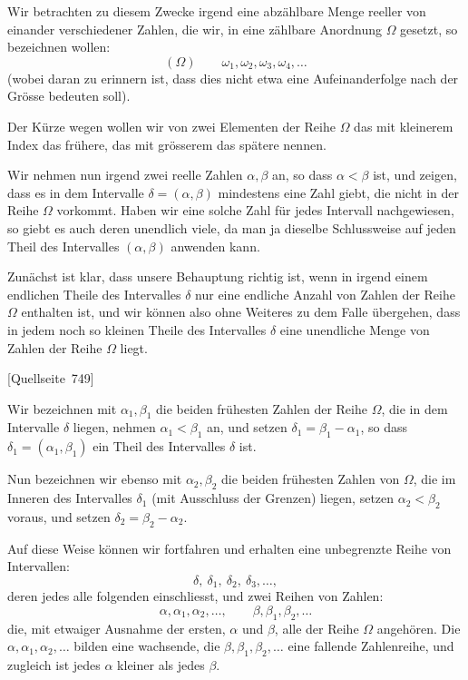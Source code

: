 \documentclass[11pt]{article}
\newcommand{\srcpage}[1]{\par\medskip\noindent\textsf{[Quellseite~#1]}\par\smallskip}
\begin{document}
Wir betrachten zu diesem Zwecke irgend eine abzählbare Menge reeller von einander verschiedener Zahlen, die wir, in eine zählbare Anordnung $\Omega$ gesetzt, so bezeichnen wollen:
\[
(\Omega)\qquad \omega_1,\omega_2,\omega_3,\omega_4,\ldots
\]
(wobei daran zu erinnern ist, dass dies nicht etwa eine Aufeinanderfolge nach der Grösse bedeuten soll).

Der Kürze wegen wollen wir von zwei Elementen der Reihe $\Omega$ das mit kleinerem Index das frühere, das mit grösserem das spätere nennen.

Wir nehmen nun irgend zwei reelle Zahlen $\alpha,\beta$ an, so dass $\alpha<\beta$ ist, und zeigen, dass es in dem Intervalle $\delta=(\alpha,\beta)$ mindestens eine Zahl giebt, die nicht in der Reihe $\Omega$ vorkommt. Haben wir eine solche Zahl für jedes Intervall nachgewiesen, so giebt es auch deren unendlich viele, da man ja dieselbe Schlussweise auf jeden Theil des Intervalles $(\alpha,\beta)$ anwenden kann.

Zunächst ist klar, dass unsere Behauptung richtig ist, wenn in irgend einem endlichen Theile des Intervalles $\delta$ nur eine endliche Anzahl von Zahlen der Reihe $\Omega$ enthalten ist, und wir können also ohne Weiteres zu dem Falle übergehen, dass in jedem noch so kleinen Theile des Intervalles $\delta$ eine unendliche Menge von Zahlen der Reihe $\Omega$ liegt.

\srcpage{749}
Wir bezeichnen mit $\alpha_1,\beta_1$ die beiden frühesten Zahlen der Reihe $\Omega$, die in dem Intervalle $\delta$ liegen, nehmen $\alpha_1<\beta_1$ an, und setzen $\delta_1=\beta_1-\alpha_1$, so dass $\delta_1=(\alpha_1,\beta_1)$ ein Theil des Intervalles $\delta$ ist.

Nun bezeichnen wir ebenso mit $\alpha_2,\beta_2$ die beiden frühesten Zahlen von $\Omega$, die im Inneren des Intervalles $\delta_1$ (mit Ausschluss der Grenzen) liegen, setzen $\alpha_2<\beta_2$ voraus, und setzen $\delta_2=\beta_2-\alpha_2$.

Auf diese Weise können wir fortfahren und erhalten eine unbegrenzte Reihe von Intervallen:
\[
\delta,\ \delta_1,\ \delta_2,\ \delta_3,\ldots,
\]
deren jedes alle folgenden einschliesst, und zwei Reihen von Zahlen:
\[
\alpha,\alpha_1,\alpha_2,\ldots,\qquad
\beta,\beta_1,\beta_2,\ldots
\]
die, mit etwaiger Ausnahme der ersten, $\alpha$ und $\beta$, alle der Reihe $\Omega$ angehören. Die $\alpha,\alpha_1,\alpha_2,\ldots$ bilden eine wachsende, die $\beta,\beta_1,\beta_2,\ldots$ eine fallende Zahlenreihe, und zugleich ist jedes $\alpha$ kleiner als jedes $\beta$.
\end{document}
